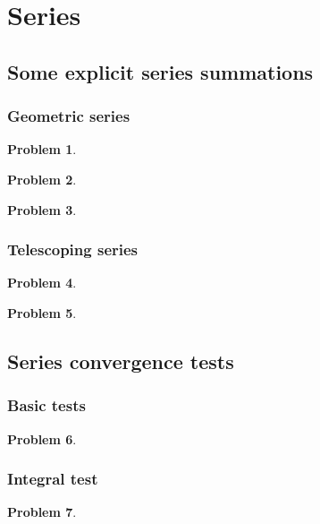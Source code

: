 \documentclass{article}
\newtheorem{problem}{Problem}
\begin{document}
\section{Series}
\subsection{Some explicit series summations}
\subsubsection{Geometric series}
\begin{problem}

\end{problem}
\begin{problem}

\end{problem}
\begin{problem}

\end{problem}

\subsubsection{Telescoping series}
\begin{problem}

\end{problem}

\begin{problem}

\end{problem}

\subsection{Series convergence tests}
\subsubsection{Basic tests}
\begin{problem}

\end{problem}



\subsubsection{Integral test}
\begin{problem}

\end{problem}

\end{document}
